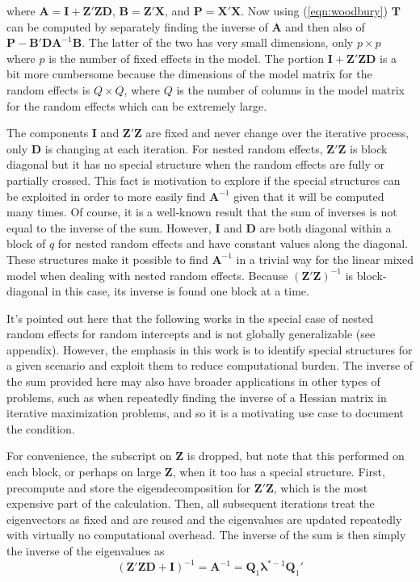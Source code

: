 \documentclass[12pt]{article}
\begin{document}
\noindent where $\bm{A} = \bm{I} +  \bm{Z}'\bm{Z}\bm{D}$, $\bm{B} = \bm{Z}'\bm{X}$, and $\bm{P} = \bm{X}'\bm{X}$. Now using (\ref{eqn:woodbury}) $\bm{T}$ can be computed by separately finding the inverse of $\bm{A}$ and then also of $\bm{P} - \bm{B}'\bm{D}\bm{A}^{-1}\bm{B}$. The latter of the two has very small dimensions, only $p \times p$ where $p$ is the number of fixed effects in the model. The portion $\bm{I} + \bm{Z}'\bm{Z}\bm{D}$ is a bit more cumbersome because the dimensions of the model matrix for the random effects is $Q \times Q$, where $Q$ is the number of columns in the model matrix for the random effects which can be extremely large. 

The components $\bm{I}$ and $\bm{Z}'\bm{Z}$ are fixed and never change over the iterative process, only $\bm{D}$ is changing at each iteration. For nested random effects, $\bm{Z}'\bm{Z}$ is block diagonal but it has no special structure when the random effects are fully or partially crossed. This fact is motivation to explore if the special structures can be exploited in order to more easily find $\bm{A}^{-1}$ given that it will be computed many times. Of course, it is a well-known result that the sum of inverses is not equal to the inverse of the sum. However, $\bm{I}$ and $\bm{D}$ are both diagonal within a block of $q$ for nested random effects and have constant values along the diagonal. These structures make it possible to find $\bm{A}^{-1}$ in a trivial way for the linear mixed model when dealing with nested random effects. Because $(\bm{Z}'\bm{Z})^{-1}$ is block-diagonal in this case, its inverse is found one block at a time. 

It's pointed out here that the following works in the special case of nested random effects for random intercepts and is not globally generalizable (see appendix). However, the emphasis in this work is to identify special structures for a given scenario and exploit them to reduce computational burden. The inverse of the sum provided here may also have broader applications in other types of problems, such as when repeatedly finding the inverse of a Hessian matrix in iterative maximization problems, and so it is a motivating use case to document the condition.

For convenience, the subscript on $\bm{Z}$ is dropped, but note that this performed on each block, or perhaps on large $\bm{Z}$, when it too has a special structure. First, precompute and store the eigendecomposition for $\bm{Z}'\bm{Z}$, which is the most expensive part of the calculation. Then, all subsequent iterations treat the eigenvectors as fixed and are reused and the eigenvalues are updated repeatedly with virtually no computational overhead. The inverse of the sum is then simply the inverse of the eigenvalues as  
\begin{equation}
\label{eqn:decompZ}
(\bm{Z}'\bm{Z}\bm{D} + \bm{I})^{-1} = \bm{A}^{-1} = \bm{Q}_1 \bm{\lambda}^{*-1} \bm{Q}_1'
\end{equation}
\end{document}
